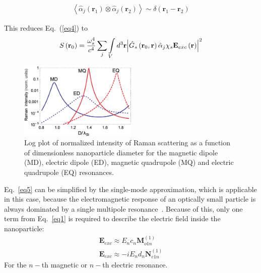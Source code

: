         \begin{align}
            \left\langle {\hat \alpha_j \left( {{{\mathbf{r}}_1}} \right) \otimes \hat \alpha_j \left( {{{\mathbf{r}}_2}} \right)} \right\rangle \sim \delta \left({{\mathbf{r}_1} - {\mathbf{r}_2}} \right)
        \end{align}

        This reduces Eq.~(\ref{eq4}) to
        \begin{align}
            S\left( {{{\bf{r}}_0}} \right) = \frac{{\omega _s^4}}{{{c^4}}}\sum\limits_j {\int\limits_V {{d^3}{\bf{r}}{{\left| {{{\hat G}_s}\left(
            {{{\bf{r}}_0},{\bf{r}}} \right){{\hat \alpha }_j}{\chi _s}{{\bf{E}}_{exc}}\left( {\bf{r}} \right)} \right|}^2}} }
            \label{eq5}
        \end{align}
        \begin{figure}[!ht]
            \begin{center}
                \includegraphics[width=0.5\textwidth]{figs/intro/TheoryEnhancement.eps}
            \end{center}
            \caption{Log plot of normalized intensity of Raman scattering as a function of dimensionless nanoparticle diameter for the magnetic dipole (MD),
            electric dipole (ED), magnetic quadrupole (MQ) and electric quadrupole (EQ) resonances.}
            \label{fig:TheoryEnhancement}
        \end{figure}

            Eq.~\ref{eq5} can be simplified by the single-mode approximation, which is applicable in this case, because the electromagnetic
        response of an optically small particle is always dominated by a single multipole resonance~\cite{evlyukhin2010optical}. Because
        of this, only one term from Eq.~\ref{eq1} is required to describe the electric field inside the nanoparticle:
        \begin{align}
            {{\mathbf{{E}}}_{exc}} \approx {E_n}{c_n}{\mathbf{M}}_{o1n}^{(1)} \\
            {{\mathbf{{E}}}_{exc}}\approx -i{E_n}{d_n}{\mathbf{N}}_{e1n}^{(1)}
        \end{align}
        For the $n-$th magnetic or $n-$th electric resonance.

